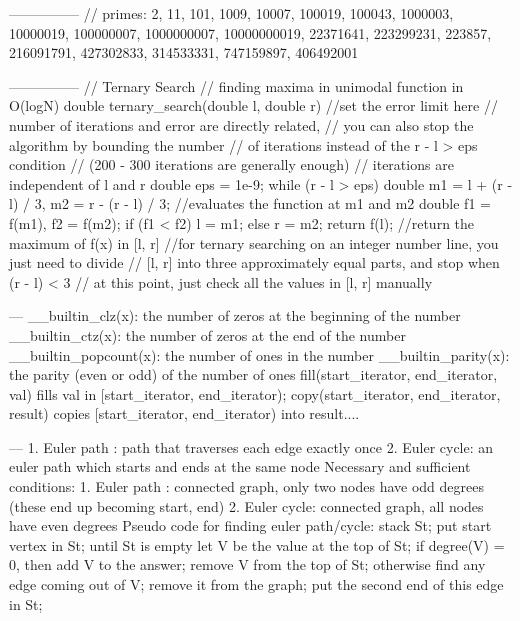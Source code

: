 {---------------
// primes:
2, 11, 101, 1009, 10007, 100019, 100043, 1000003, 10000019, 100000007, 1000000007, 10000000019,
22371641, 223299231, 223857, 216091791, 427302833, 314533331, 747159897, 406492001

---------------
// Ternary Search
// finding maxima in unimodal function in O(logN)
double ternary_search(double l, double r) {
    //set the error limit here
    // number of iterations and error are directly related,
    // you can also stop the algorithm by bounding the number 
    // of iterations instead of the r - l > eps condition
    // (200 - 300 iterations are generally enough) 
    // iterations are independent of l and r
    double eps = 1e-9;              
    while (r - l > eps) {
        double m1 = l + (r - l) / 3, m2 = r - (r - l) / 3;
        //evaluates the function at m1 and m2
        double f1 = f(m1), f2 = f(m2);
        if (f1 < f2)    l = m1;
        else    r = m2;
    }
    return f(l);                    //return the maximum of f(x) in [l, r]
}
//for ternary searching on an integer number line, you just need to divide 
// [l, r] into three approximately equal parts, and stop when (r - l) < 3
// at this point, just check all the values in [l, r] manually

---
__builtin_clz(x): the number of zeros at the beginning of the number
__builtin_ctz(x): the number of zeros at the end of the number
__builtin_popcount(x): the number of ones in the number
__builtin_parity(x): the parity (even or odd) of the number of ones
fill(start_iterator, end_iterator, val) fills val in [start_iterator, end_iterator);
copy(start_iterator, end_iterator, result) copies [start_iterator, end_iterator) into result....

---
1. Euler path : path that traverses each edge exactly once
2. Euler cycle: an euler path which starts and ends at the same node
Necessary and sufficient conditions:
1. Euler path : connected graph, only two nodes have odd degrees (these end up becoming start, end)
2. Euler cycle: connected graph, all nodes have even degrees
Pseudo code for finding euler path/cycle:
stack St;
put start vertex in St;
until St is empty
  let V be the value at the top of St;
  if degree(V) = 0, then
    add V to the answer;
    remove V from the top of St;
  otherwise
    find any edge coming out of V;
    remove it from the graph;
    put the second end of this edge in St;

}
